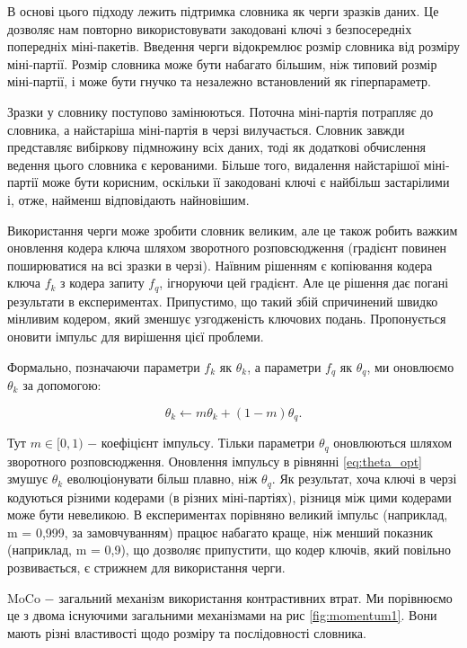 В основі цього підходу лежить підтримка словника як черги зразків даних. Це дозволяє нам повторно використовувати закодовані ключі з безпосередніх попередніх міні-пакетів. Введення черги відокремлює розмір словника від розміру міні-партії. Розмір словника може бути набагато більшим, ніж типовий розмір міні-партії, і може бути гнучко та незалежно встановлений як гіперпараметр.

Зразки у словнику поступово замінюються. Поточна міні-партія потрапляє до словника, а найстаріша міні-партія в черзі вилучається. Словник завжди представляє вибіркову підмножину всіх даних, тоді як додаткові обчислення ведення цього словника є керованими. Більше того, видалення найстарішої міні-партії може бути корисним, оскільки її закодовані ключі є найбільш застарілими і, отже, найменш відповідають найновішим.

Використання черги може зробити словник великим, але це також робить важким оновлення кодера ключа шляхом зворотного розповсюдження (градієнт повинен поширюватися на всі зразки в черзі). Наївним рішенням є копіювання кодера ключа $f_{k}$ з кодера запиту $f_{q}$, ігноруючи цей градієнт. Але це рішення дає погані результати в експериментах. Припустимо, що такий збій спричинений швидко мінливим кодером, який зменшує узгодженість ключових подань. Пропонується оновити імпульс для вирішення цієї проблеми.

Формально, позначаючи параметри $f_{k}$ як $\theta_{k}$, а параметри $f_{q}$ як $\theta_{q}$, ми оновлюємо $\theta_{k}$ за допомогою:

\begin{equation}\label{eq:theta_opt}
\theta_{k} \leftarrow m\theta_{k} + (1 - m)\theta_{q}.
\end{equation}

\vspace{1.5em}

Тут $m \in [0, 1)$ $-$ коефіцієнт імпульсу. Тільки параметри $\theta_{q}$ оновлюються шляхом зворотного розповсюдження. Оновлення імпульсу в рівнянні \ref{eq:theta_opt} змушує $\theta_{k}$ еволюціонувати більш плавно, ніж $\theta_{q}$. Як результат, хоча ключі в черзі кодуються різними кодерами (в різних міні-партіях), різниця між цими кодерами може бути невеликою. В експериментах порівняно великий імпульс (наприклад, m = 0,999, за замовчуванням) працює набагато краще, ніж менший показник (наприклад, m = 0,9), що дозволяє припустити, що кодер ключів, який повільно розвивається, є стрижнем для використання черги.

MoCo $-$ загальний механізм використання контрастивних втрат. Ми порівнюємо це з двома існуючими загальними механізмами на рис \ref{fig:momentum1}. Вони мають різні властивості щодо розміру та послідовності словника.

